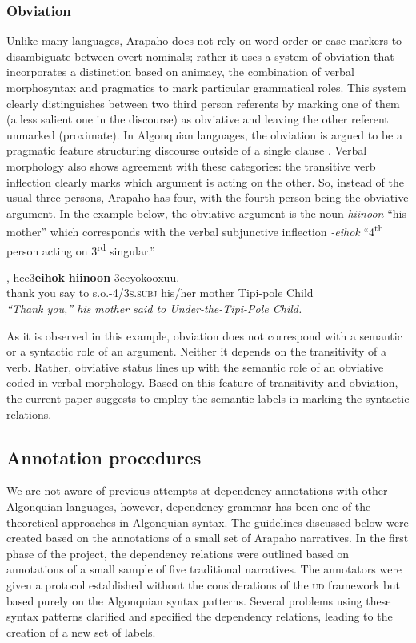 \documentclass[11pt]{article}
\begin{document}
 \subsubsection{Obviation}
Unlike many languages, Arapaho does not rely on word order or case markers to disambiguate between overt nominals; rather it uses a system of obviation that incorporates a distinction based on animacy, the combination of verbal morphosyntax and pragmatics to mark particular grammatical roles. This system clearly distinguishes between two third person referents by marking one of them (a less salient one in the discourse) as obviative and leaving the other referent unmarked (proximate). In Algonquian languages, the obviation is argued to be a pragmatic feature structuring discourse outside of a single clause \cite{Goddard1984}. Verbal morphology also shows agreement with these categories: the transitive verb inflection clearly marks which argument is acting on  the other. So, instead of the usual three persons, Arapaho has four, with the fourth person being the obviative argument. In the example below, the obviative argument is the noun \textit{hiinoon} ``his mother'' which corresponds with the verbal subjunctive inflection \textit{-eihok} ``4\textsuperscript{th} person acting on 3\textsuperscript{rd} singular.'' 

\small
\begin{exe}
\ex \label{obviation}
, {hee3\textbf{eihok}} {\textbf{hiinoon}} {3eeyokooxuu}.\\
{thank you} {say to s.o.-\textsc{4/3s.subj}} {his/her mother} {Tipi-pole Child} \\
\trans \textit{``Thank you,'' his mother said to Under-the-Tipi-Pole Child.}
\end{exe}
\normalsize
As it is observed in this example, obviation does not correspond with a semantic or a syntactic role of an argument. Neither it depends on the transitivity of a verb. Rather, obviative status lines up with the semantic role of an obviative coded in verbal morphology. Based on this feature of transitivity and obviation, the current paper suggests to employ the semantic labels in marking the syntactic relations. 
\subsection{Annotation procedures}
We are not aware of previous attempts at dependency annotations with other Algonquian languages, however, dependency grammar has been one of the theoretical approaches in Algonquian syntax.  The guidelines discussed below were created based on the annotations of a small set of Arapaho narratives. In the first phase of the project, the dependency relations were outlined based on annotations of a small sample of five traditional narratives. The annotators were given a protocol established without the considerations of the \textsc{ud} framework but based purely on the Algonquian syntax patterns. Several problems using these syntax patterns clarified and specified the dependency relations, leading to the creation of a new set of labels. 
\end{document}
